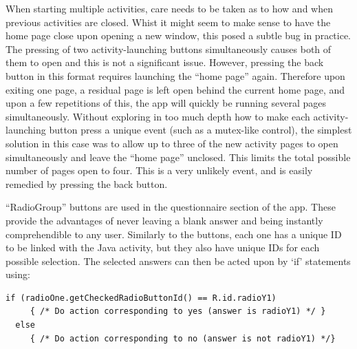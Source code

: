 	 When starting multiple activities, care needs to be taken as to how and when previous activities are closed. Whist it might seem to make sense to have the home page close upon opening a new window, this posed a subtle bug in practice. The pressing of two activity-launching buttons simultaneously causes both of them to open and this is not a significant issue. However, pressing the back button in this format requires launching the ``home page'' again. Therefore upon exiting one page, a residual page is left open behind the current home page, and upon a few repetitions of this, the app will quickly be running several pages simultaneously. Without exploring in too much depth how to make each activity-launching button press a unique event (such as a mutex-like control), the simplest solution in this case was to allow up to three of the new activity pages to open simultaneously and leave the ``home page'' unclosed. This limits the total possible number of pages open to four. This is a very unlikely event, and is easily remedied by pressing the back button.

	 ``RadioGroup'' buttons are used in the questionnaire section of the app. These provide the advantages of never leaving a blank answer and being instantly comprehendible to any user. Similarly to the buttons, each one has a unique ID to be linked with the Java activity, but they also have unique IDs for each possible selection. The selected answers can then be acted upon by `if' statements using:
\begin{lstlisting}
if (radioOne.getCheckedRadioButtonId() == R.id.radioY1)
 	 { /* Do action corresponding to yes (answer is radioY1) */ } 
  else
 	 { /* Do action corresponding to no (answer is not radioY1) */}
\end{lstlisting}
